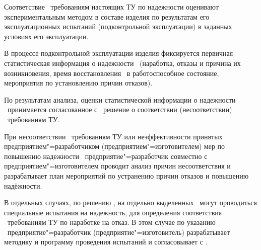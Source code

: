 Соответствие \dut \ требованиям настоящих ТУ по надежности оценивают экспериментальным методом в составе изделия по результатам его эксплуатационных испытаний (подконтрольной эксплуатации) в заданных условиях его эксплуатации. 

В процессе подконтрольной эксплуатации изделия фиксируется первичная статистическая информация о надежности \dut \ (наработка, отказы и причина их возникновения, время восстановления \dut \ в работоспособное состояние, мероприятия по установлению причин отказов). 

По результатам анализа, оценки статистической информации о надежности \dut \ принимается согласованное с \client \ решение о соответствии (несоответствии) \dut \ требованиям ТУ.

При несоответствии \dut \ требованиям ТУ или неэффективности принятых предприятием"=разработчиком (предприятием"=изготовителем) мер по повышению надежности \dut \, предприятие"=разработчик совместно с предприятием"=изготовителем проводит анализ причин несоответствия и разрабатывает план мероприятий по устранению причин отказов и повышению надёжности.

В отдельных случаях, по решению \client, на отдельно выделенных \dut \ могут проводиться специальные испытания на надежность, для определения соответствия \dut \ требованиям ТУ по наработке на отказ. В этом случае по указанию \client \ предприятие"=разработчик (предприятие"=изготовитель) разрабатывает методику и программу проведения испытаний и согласовывает с \client.


